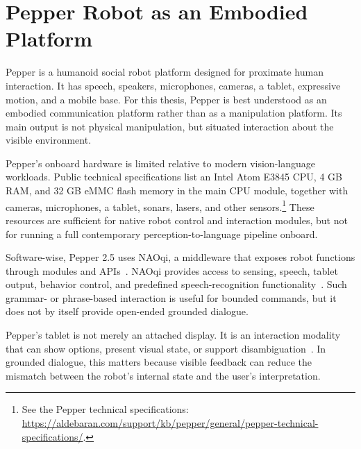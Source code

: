 
\section{Pepper Robot as an Embodied Platform}\label{sec:pepper-platform}

Pepper is a humanoid social robot platform designed for proximate human interaction. It has speech, speakers, microphones, cameras, a tablet, expressive motion, and a mobile base. For this thesis, Pepper is best understood as an embodied communication platform rather than as a manipulation platform. Its main output is not physical manipulation, but situated interaction about the visible environment.

Pepper's onboard hardware is limited relative to modern vision-language workloads. Public technical specifications list an Intel Atom E3845 CPU, 4 GB RAM, and 32 GB eMMC flash memory in the main CPU module, together with cameras, microphones, a tablet, sonars, lasers, and other sensors.\footnote{See the Pepper technical specifications: \url{https://aldebaran.com/support/kb/pepper/general/pepper-technical-specifications/}.} These resources are sufficient for native robot control and interaction modules, but not for running a full contemporary perception-to-language pipeline onboard.

Software-wise, Pepper 2.5 uses NAOqi, a middleware that exposes robot functions through modules and APIs~\cite{softbank_python_sdk_2026}. NAOqi provides access to sensing, speech, tablet output, behavior control, and predefined speech-recognition functionality~\cite{softbank_alspeechrecognition_2026}. Such grammar- or phrase-based interaction is useful for bounded commands, but it does not by itself provide open-ended grounded dialogue.

Pepper's tablet is not merely an attached display. It is an interaction modality that can show options, present visual state, or support disambiguation~\cite{softbank_peppers_tablet_2026}. In grounded dialogue, this matters because visible feedback can reduce the mismatch between the robot's internal state and the user's interpretation.

